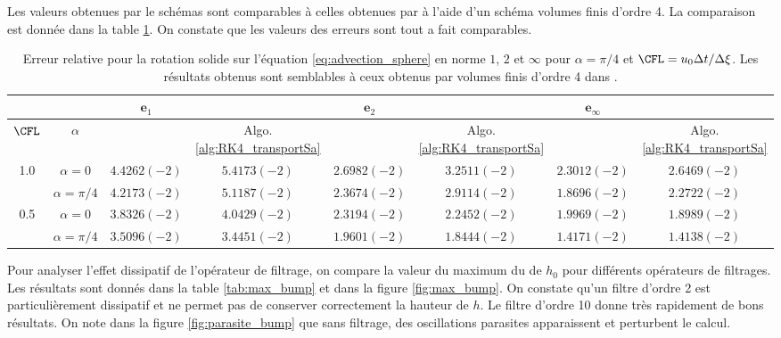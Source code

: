 Les valeurs obtenues par le schémas sont comparables à celles obtenues par \cite{Ullrich2010, Ullrich2011} à l'aide d'un schéma volumes finis d'ordre 4. La comparaison est donnée dans la table \ref{tab:comp_ullrich_bump}. On constate que les valeurs des erreurs sont tout a fait comparables.

\begin{table}[htbp]
\begin{center}
\begin{tabular}{|cc||cc||cc||cc|}
\hline 
 & & $\mathbf{e}_1$ &   & $\mathbf{e}_2$ &   & $\mathbf{e}_{\infty}$ &   \\ 
\hline 
$\CFL$ & $\alpha$ & \cite{Ullrich2010} & Algo. \ref{alg:RK4_transportSa} & \cite{Ullrich2010} & Algo. \ref{alg:RK4_transportSa} & \cite{Ullrich2010} & Algo. \ref{alg:RK4_transportSa} \\ 
\hline 
1.0 & $\alpha = 0$ & $4.4262(-2)$ & $5.4173(-2)$ & $2.6982(-2)$ & $3.2511(-2)$ & $2.3012(-2)$ & $2.6469(-2)$ \\ 

  & $\alpha = \pi / 4$ & $4.2173(-2)$ & $5.1187(-2)$ & $2.3674(-2)$ & $2.9114(-2)$ & $1.8696(-2)$ & $2.2722(-2)$ \\ 
\hline 
0.5 & $\alpha = 0$ & $3.8326(-2)$ & $4.0429(-2)$ & $2.3194(-2)$ & $2.2452(-2)$ & $1.9969(-2)$ & $1.8989(-2)$ \\ 

  & $\alpha = \pi/4$ & $3.5096(-2)$ & $3.4451(-2)$ & $1.9601(-2)$ & $1.8444(-2)$ & $1.4171(-2)$ & $1.4138(-2)$ \\ 
\hline 
\end{tabular} 
\end{center}
\caption{Erreur relative pour la rotation solide sur l'équation \eqref{eq:advection_sphere} en norme $1$, $2$ et $\infty$ pour $\alpha = \pi / 4$ et $\CFL = u_0 \Delta t / \Delta \xi$. Les résultats obtenus sont semblables à ceux obtenus par volumes finis d'ordre 4 dans \cite{Ullrich2010}.}
\label{tab:comp_ullrich_bump}
\end{table} 

Pour analyser l'effet dissipatif de l'opérateur de filtrage, on compare la valeur du maximum du de $h_0$ pour différents opérateurs de filtrages. Les résultats sont donnés dans la table \ref{tab:max_bump} et dans la figure \ref{fig:max_bump}. On constate qu'un filtre d'ordre 2 est particulièrement dissipatif et ne permet pas de conserver correctement la hauteur de $h$. Le filtre d'ordre 10 donne très rapidement de bons résultats. On note dans la figure \ref{fig:parasite_bump} que sans filtrage, des oscillations parasites apparaissent et perturbent le calcul.

